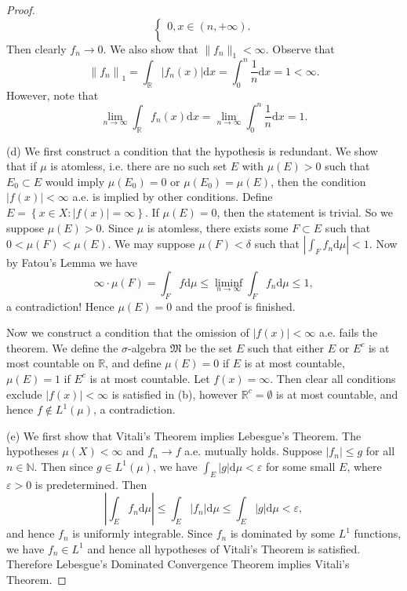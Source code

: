 \begin{proof}
$$\begin{cases}
	0,x\in \left( n,+\infty \right) .\\
\end{cases}
$$
Then clearly $f_n\to 0$. We also show that $\|f_n\|_1<\infty$. Observe that 
$$
\left\| f_n \right\| _1=\int_{\mathbb{R}}{\left| f_n\left( x \right) \right|\mathrm{d}x}=\int_0^n{\frac{1}{n}\mathrm{d}x}=1<\infty .
$$
However, note that 
$$
\lim_{n\rightarrow \infty} \int_{\mathbb{R}}{f_n\left( x \right) \mathrm{d}x}=\lim_{n\rightarrow \infty} \int_0^n{\frac{1}{n}\mathrm{d}x}=1.
$$\par
(d) We first construct a condition that the hypothesis is redundant. We show that if $\mu$ is atomless, i.e. there are no such set $E$ with $\mu(E)>0$ such that $E_0\subset E$ would imply $\mu(E_0)=0$ or $\mu(E_0)=\mu(E)$, then the condition $|f(x)|<\infty$ a.e. is implied by other conditions. Define $E=\left\{ x\in X:\left| f\left( x \right) \right|=\infty \right\} $. If $\mu(E)=0$, then the statement is trivial. So we suppose $\mu(E)>0$. Since $\mu$ is atomless, there exists some $F\subset E$ such that $0<\mu(F)<\mu(E)$. We may suppose $\mu(F)<\delta$ such that $|\int_Ff_n\mathrm{d}\mu|<1$. Now by Fatou's Lemma we have 
$$
\infty \cdot \mu \left( F \right) =\int_F{f\mathrm{d}\mu}\le \mathop {\lim\mathrm{inf}} \limits_{n\rightarrow \infty}\int_F{f_n\mathrm{d}\mu}\le 1,
$$
a contradiction! Hence $\mu(E)=0$ and the proof is finished.\par
Now we construct a condition that the omission of $|f(x)|<\infty$ a.e. fails the theorem. We define the $\sigma$-algebra $\mathfrak{M}$ be the set $E$ such that either $E$ or $E^c$ is at most countable on $\mathbb{R}$, and define $\mu(E)=0$ if $E$ is at most countable, $\mu(E)=1$ if $E^c$ is at most countable. Let $f(x)=\infty$. Then clear all conditions exclude $|f(x)|<\infty$ is satisfied in (b), however $\mathbb{R}^c=\emptyset$ is at most countable, and hence $f\notin L^1(\mu)$, a contradiction.\par
(e) We first show that Vitali's Theorem implies Lebesgue's Theorem. The hypotheses $\mu(X)<\infty$ and $f_n\to f$ a.e. mutually holds. Suppose $|f_n|\le g$ for all $n\in\mathbb{N}$. Then since $g\in L^1(\mu)$, we have $\int_E|g|\mathrm{d}\mu<\varepsilon$ for some small $E$, where $\varepsilon>0$ is predetermined. Then 
$$
\left| \int_E{f_n\mathrm{d}\mu} \right|\le \int_E{\left| f_n \right|\mathrm{d}\mu}\le \int_E{\left| g \right|\mathrm{d}\mu}<\varepsilon ,
$$
and hence $f_n$ is uniformly integrable. Since $f_n$ is dominated by some $L^1$ functions, we have $f_n\in L^1$ and hence all hypotheses of Vitali's Theorem is satisfied. Therefore Lebesgue's Dominated Convergence Theorem implies Vitali's Theorem.\par

\end{proof}
